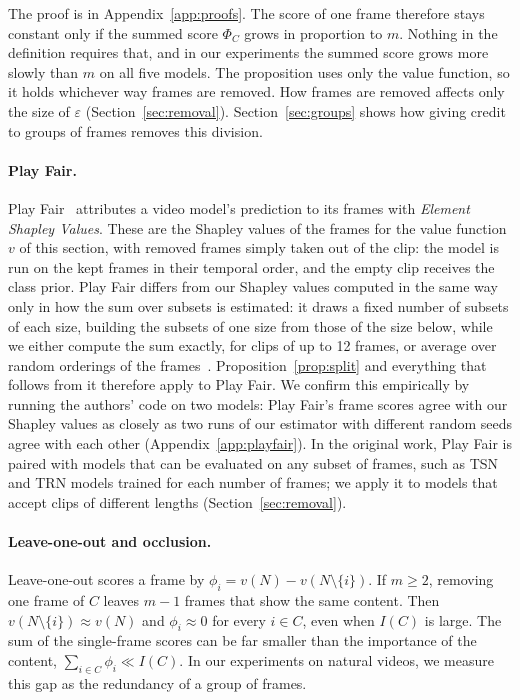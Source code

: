 The proof is in Appendix~\ref{app:proofs}.
The score of one frame therefore stays constant only if the summed score $\Phi_C$ grows in proportion to $m$.
Nothing in the definition requires that, and in our experiments the summed score grows more slowly than $m$ on all five models.
The proposition uses only the value function, so it holds whichever way frames are removed.
How frames are removed affects only the size of $\varepsilon$ (Section~\ref{sec:removal}).
Section~\ref{sec:groups} shows how giving credit to groups of frames removes this division.

\paragraph{Play Fair.}
Play Fair~\citep{will_price_ec92d5a0} attributes a video model's prediction to its frames with \emph{Element Shapley Values}.
These are the Shapley values of the frames for the value function $v$ of this section, with removed frames simply taken out of the clip: the model is run on the kept frames in their temporal order, and the empty clip receives the class prior.
Play Fair differs from our Shapley values computed in the same way only in how the sum over subsets is estimated: it draws a fixed number of subsets of each size, building the subsets of one size from those of the size below, while we either compute the sum exactly, for clips of up to 12 frames, or average over random orderings of the frames~\citep{javier_castro_28f89a07}.
Proposition~\ref{prop:split} and everything that follows from it therefore apply to Play Fair.
We confirm this empirically by running the authors' code on two models: Play Fair's frame scores agree with our Shapley values as closely as two runs of our estimator with different random seeds agree with each other (Appendix~\ref{app:playfair}).
In the original work, Play Fair is paired with models that can be evaluated on any subset of frames, such as TSN and TRN models trained for each number of frames; we apply it to models that accept clips of different lengths (Section~\ref{sec:removal}).

\paragraph{Leave-one-out and occlusion.}
Leave-one-out scores a frame by $\phi_i = v(N) - v(N \setminus \{i\})$.
If $m \ge 2$, removing one frame of $C$ leaves $m - 1$ frames that show the same content.
Then $v(N \setminus \{i\}) \approx v(N)$ and $\phi_i \approx 0$ for every $i \in C$, even when $I(C)$ is large.
The sum of the single-frame scores can be far smaller than the importance of the content, $\sum_{i \in C} \phi_i \ll I(C)$.
In our experiments on natural videos, we measure this gap as the redundancy of a group of frames.

